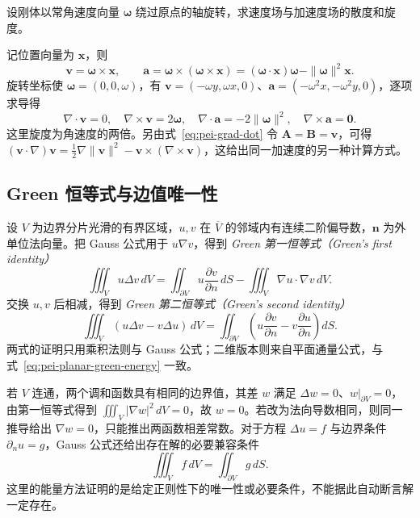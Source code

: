 \begin{example}
\label{ex:pei-rigid-rotation}
设刚体以常角速度向量 $\boldsymbol\omega$ 绕过原点的轴旋转，求速度场与加速度场的散度和旋度。
\end{example}
\begin{solve}
记位置向量为 $\boldsymbol x$，则
\[
\boldsymbol v=\boldsymbol\omega\times\boldsymbol x,
\qquad
\boldsymbol a=\boldsymbol\omega\times(\boldsymbol\omega\times\boldsymbol x)
=(\boldsymbol\omega\cdot\boldsymbol x)\boldsymbol\omega
-\|\boldsymbol\omega\|^2\boldsymbol x.
\]
旋转坐标使 $\boldsymbol\omega=(0,0,\omega)$，有 $\boldsymbol v=(-\omega y,\omega x,0)$、$\boldsymbol a=(-\omega^2x,-\omega^2y,0)$，逐项求导得
\[
\nabla\cdot\boldsymbol v=0,\quad
\nabla\times\boldsymbol v=2\boldsymbol\omega,\quad
\nabla\cdot\boldsymbol a=-2\|\boldsymbol\omega\|^2,\quad
\nabla\times\boldsymbol a=\boldsymbol0.
\]
这里旋度为角速度的两倍。另由式~\eqref{eq:pei-grad-dot} 令 $\boldsymbol A=\boldsymbol B=\boldsymbol v$，可得
$(\boldsymbol v\cdot\nabla)\boldsymbol v
=\frac12\nabla\|\boldsymbol v\|^2-\boldsymbol v\times(\nabla\times\boldsymbol v)$，这给出同一加速度的另一种计算方式。
\end{solve}

\subsection{Green 恒等式与边值唯一性}

设 $V$ 为边界分片光滑的有界区域，$u,v$ 在 $\overline V$ 的邻域内有连续二阶偏导数，$\boldsymbol n$ 为外单位法向量。把 Gauss 公式用于 $u\nabla v$，得到 \emph{Green 第一恒等式（Green's first identity）}
\begin{equation}
\label{eq:pei-green-first-identity}
\iiint_Vu\Delta v\,dV
=\iint_{\partial V}u\frac{\partial v}{\partial n}\,dS
-\iiint_V\nabla u\cdot\nabla v\,dV.
\end{equation}
交换 $u,v$ 后相减，得到 \emph{Green 第二恒等式（Green's second identity）}
\begin{equation}
\label{eq:pei-green-second-identity}
\iiint_V(u\Delta v-v\Delta u)\,dV
=\iint_{\partial V}\left(u\frac{\partial v}{\partial n}
-v\frac{\partial u}{\partial n}\right)dS.
\end{equation}
两式的证明只用乘积法则与 Gauss 公式；二维版本则来自平面通量公式，与式~\eqref{eq:pei-planar-green-energy} 一致。

若 $V$ 连通，两个调和函数具有相同的边界值，其差 $w$ 满足 $\Delta w=0$、$w|_{\partial V}=0$，由第一恒等式得到 $\iiint_V|\nabla w|^2\,dV=0$，故 $w=0$。若改为法向导数相同，则同一推导给出 $\nabla w=0$，只能推出两函数相差常数。对于方程 $\Delta u=f$ 与边界条件 $\partial_nu=g$，Gauss 公式还给出存在解的必要兼容条件
\[
\iiint_V f\,dV=\iint_{\partial V}g\,dS.
\]
这里的能量方法证明的是给定正则性下的唯一性或必要条件，不能据此自动断言解一定存在。

